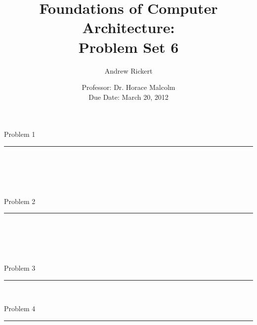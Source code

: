 \documentclass[11pt,reqno]{article}
\title{Foundations of Computer Architecture: \\ Problem Set 6 }
\author{Andrew Rickert}
\date{Professor: Dr. Horace Malcolm \\ \hspace{-33pt} Due Date: March 20,  2012}                                           %
\begin{document}
\maketitle


\begin{flushleft} 
Problem 1 \\
\rule{500pt}{1pt}\\
\end{flushleft} 


\noindent{}\\ 

\noindent{}\\ 


\begin{flushleft} 
Problem 2 \\
\rule{500pt}{1pt}\\
\end{flushleft} 


\noindent{}\\ 

\noindent{}\\ 


\begin{flushleft} 
Problem 3 \\
\rule{500pt}{1pt}\\
\end{flushleft} 


\begin{flushleft} 
Problem 4 \\
\rule{500pt}{1pt}\\
\end{flushleft} 
\end{document}
